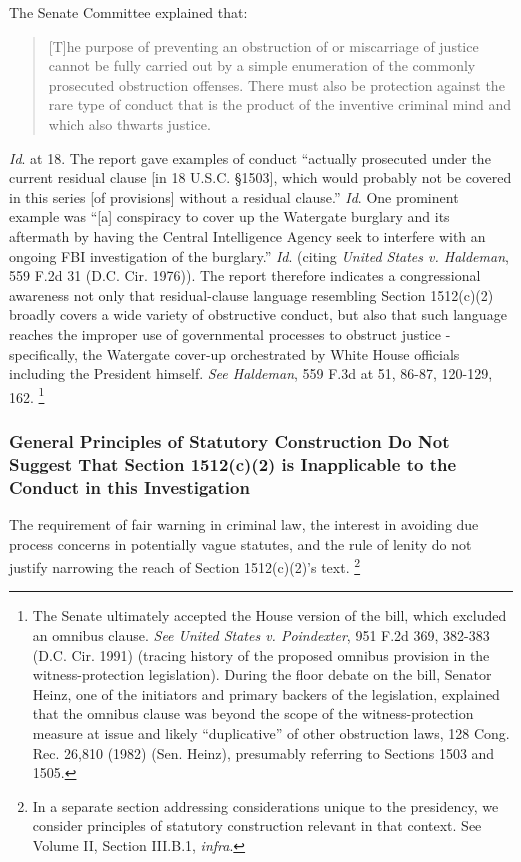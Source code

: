 The Senate Committee explained that:

\begin{quote}
[T]he purpose of preventing an obstruction of or miscarriage of justice cannot be fully carried out by a simple enumeration of the commonly prosecuted obstruction offenses.
There must also be protection against the rare type of conduct that is the product of the inventive criminal mind and which also thwarts justice.
\end{quote}

\textit{Id}. at 18.
The report gave examples of conduct “actually prosecuted under the current residual clause [in 18 U.S.C. \S 1503], which would probably not be covered in this series [of provisions] without a residual clause.”
\textit{Id}.
One prominent example was “[a] conspiracy to cover up the Watergate burglary and its aftermath by having the Central Intelligence Agency seek to interfere with an ongoing FBI investigation of the burglary.”
\textit{Id}. (citing \textit{United States v. Haldeman}, 559 F.2d 31 (D.C. Cir. 1976)).
The report therefore indicates a congressional awareness not only that residual-clause language resembling Section 1512(c)(2) broadly covers a wide variety of obstructive conduct, but also that such language reaches the improper use of governmental processes to obstruct justice - specifically, the Watergate cover-up orchestrated by White House officials including the President himself.
\textit{See Haldeman}, 559 F.3d at 51, 86-87, 120-129, 162.%
\footnote{The Senate ultimately accepted the House version of the bill, which excluded an omnibus clause.
\textit{See United States v. Poindexter}, 951 F.2d 369, 382-383 (D.C. Cir. 1991) (tracing history of the proposed omnibus provision in the witness-protection legislation).
During the floor debate on the bill, Senator Heinz, one of the initiators and primary backers of the legislation, explained that the omnibus clause was beyond the scope of the witness-protection measure at issue and likely “duplicative” of other obstruction laws, 128 Cong. Rec. 26,810 (1982) (Sen. Heinz), presumably referring to Sections 1503 and 1505.}

\subsubsection{General Principles of Statutory Construction Do Not Suggest That Section 1512(c)(2) is Inapplicable to the Conduct in this Investigation}

The requirement of fair warning in criminal law, the interest in avoiding due process concerns in potentially vague statutes, and the rule of lenity do not justify narrowing the reach of Section 1512(c)(2)’s text.%
\footnote{In a separate section addressing considerations unique to the presidency, we consider principles of statutory construction relevant in that context.
See Volume II, Section III.B.1, \textit{infra}.}

